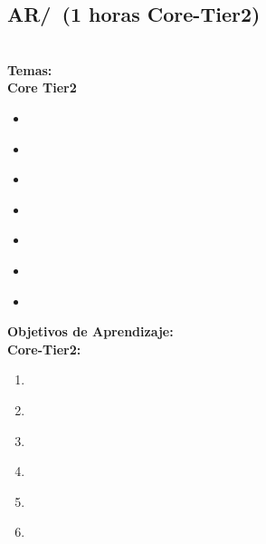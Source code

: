 \subsection{AR/\ARInterfacingandcommunication~(1 horas Core-Tier2)}\label{sec:BOK:ARInterfacingandcommunication}
\ARInterfacingandcommunicationDescription\\
\noindent \textbf{Temas:}\\
\noindent \textbf{Core Tier2}
\begin{itemize}
	\item \ARInterfacingandcommunicationTopicI\label{sec:BOK:ARInterfacingandcommunicationTopicI}
	\item \ARInterfacingandcommunicationTopicInterrupt\label{sec:BOK:ARInterfacingandcommunicationTopicInterrupt}
	\item \ARInterfacingandcommunicationTopicExternal\label{sec:BOK:ARInterfacingandcommunicationTopicExternal}
	\item \ARInterfacingandcommunicationTopicBuses\label{sec:BOK:ARInterfacingandcommunicationTopicBuses}
	\item \ARInterfacingandcommunicationTopicIntroduction\label{sec:BOK:ARInterfacingandcommunicationTopicIntroduction}
	\item \ARInterfacingandcommunicationTopicMultimedia\label{sec:BOK:ARInterfacingandcommunicationTopicMultimedia}
	\item \ARInterfacingandcommunicationTopicRaid\label{sec:BOK:ARInterfacingandcommunicationTopicRaid}
\end{itemize}


\noindent \textbf{Objetivos de Aprendizaje:}\\
\noindent \textbf{Core-Tier2:}
\begin{enumerate}
	\setcounter{enumi}{0}
	\item \ARInterfacingandcommunicationLOExplainHowUsed\xspace[\ARInterfacingandcommunicationLOExplainHowUsedLevel]\label{sec:BOK:ARInterfacingandcommunicationLOExplainHowUsed}
	\item \ARInterfacingandcommunicationLOIdentifyVarious\xspace[\ARInterfacingandcommunicationLOIdentifyVariousLevel]\label{sec:BOK:ARInterfacingandcommunicationLOIdentifyVarious}
	\item \ARInterfacingandcommunicationLODescribeData\xspace[\ARInterfacingandcommunicationLODescribeDataLevel]\label{sec:BOK:ARInterfacingandcommunicationLODescribeData}
	\item \ARInterfacingandcommunicationLOCompare\xspace[\ARInterfacingandcommunicationLOCompareLevel]\label{sec:BOK:ARInterfacingandcommunicationLOCompare}
	\item \ARInterfacingandcommunicationLOIdentifyThe\xspace[\ARInterfacingandcommunicationLOIdentifyTheLevel]\label{sec:BOK:ARInterfacingandcommunicationLOIdentifyThe}
	\item \ARInterfacingandcommunicationLODescribeTheLimitations\xspace[\ARInterfacingandcommunicationLODescribeTheLimitationsLevel]\label{sec:BOK:ARInterfacingandcommunicationLODescribeTheLimitations}
\end{enumerate}


